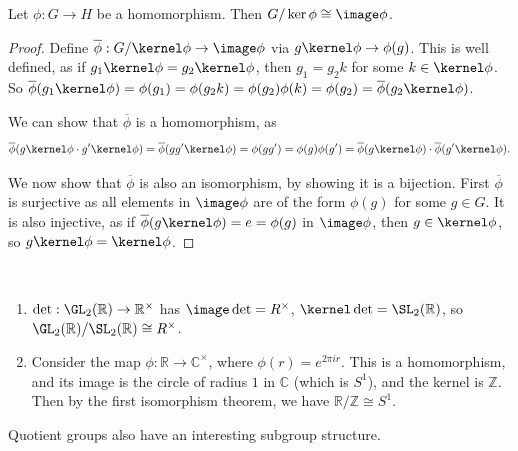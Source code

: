 \documentclass[a4paper]{scrartcl}
\begin{document}
\begin{theorem}
	Let $\phi : G \rightarrow H$ be a homomorphism. Then $G/\ker \phi \cong \image \phi$.
\end{theorem}
\begin{proof}
	Define $\overline{\phi} : G/\kernel \phi \rightarrow \image \phi$ via $g \kernel \phi \rightarrow \phi(g)$.
	This is well defined, as if $g_1 \kernel \phi = g_2 \kernel \phi$, then $g_1 = g_2k$ for some $k \in \kernel \phi$. So $\overline{\phi}(g_1 \kernel \phi) = \phi(g_1) = \phi(g_2 k) = \phi(g_2) \phi(k) = \phi(g_2) = \overline{\phi}(g_2 \kernel \phi)$.

	We can show that $\overline{\phi}$ is a homomorphism, as 
	$$
	\overline{\phi}(g \kernel \phi \cdot g' \kernel \phi) = \overline{\phi}(g g' \kernel \phi) = \phi(g g') = \phi(g) \phi(g') = \overline{\phi}(g \kernel \phi) \cdot \overline{\phi}(g' \kernel \phi).
	$$

	We now show that $\overline{\phi}$ is also an isomorphism, by showing it is a bijection. First $\overline{\phi}$ is surjective as all elements in $\image \phi$ are of the form $\phi(g)$ for some $g \in G$. It is also injective, as if $\overline{\phi}(g \kernel \phi) = e = \phi(g)$ in $\image \phi$, then $g \in \kernel \phi$, so $g \kernel \phi = \kernel \phi$.
\end{proof}

\begin{example}~
    \vspace*{-1.5\baselineskip}
\begin{enumerate}[label=(\roman*)]
    \item $\det : \GL_2(\mathbb{R}) \rightarrow \mathbb{R}^\times$ has $\image \det = R^\times$, $\kernel \det = \SL_2(\mathbb{R})$, so $\GL_2(\mathbb{R}) / \SL_2(\mathbb{R}) \cong R^\times$.
    \item Consider the map $\phi : \mathbb{R} \rightarrow \mathbb{C}^\times$, where $\phi(r) = e^{2 \pi i r}$. This is a homomorphism, and its image is the circle of radius $1$ in $\mathbb{C}$ (which is $S^1$), and the kernel is $\mathbb{Z}$. Then by the first isomorphism theorem, we have $\mathbb{R}/\mathbb{Z} \cong S^1$.
\end{enumerate}
\end{example}

Quotient groups also have an interesting subgroup structure.
\end{document}
